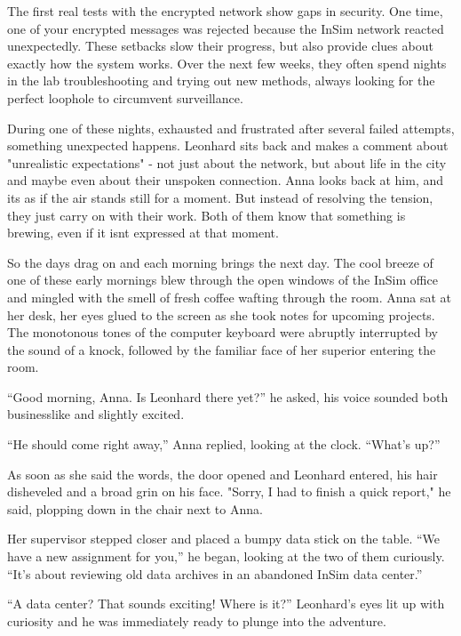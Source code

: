 \documentclass[
]{article}
\begin{document}
The first real tests with the encrypted network show gaps in security.
One time, one of your encrypted messages was rejected because the InSim
network reacted unexpectedly. These setbacks slow their progress, but
also provide clues about exactly how the system works. Over the next few
weeks, they often spend nights in the lab troubleshooting and trying out
new methods, always looking for the perfect loophole to circumvent
surveillance.

During one of these nights, exhausted and frustrated after several
failed attempts, something unexpected happens. Leonhard sits back and
makes a comment about "unrealistic expectations" - not just about the
network, but about life in the city and maybe even about their unspoken
connection. Anna looks back at him, and it\textquotesingle s as if the
air stands still for a moment. But instead of resolving the tension,
they just carry on with their work. Both of them know that something is
brewing, even if it isn\textquotesingle t expressed at that moment.

So the days drag on and each morning brings the next day. The cool
breeze of one of these early mornings blew through the open windows of
the InSim office and mingled with the smell of fresh coffee wafting
through the room. Anna sat at her desk, her eyes glued to the screen as
she took notes for upcoming projects. The monotonous tones of the
computer keyboard were abruptly interrupted by the sound of a knock,
followed by the familiar face of her superior entering the room.

``Good morning, Anna. Is Leonhard there yet?'' he asked, his voice
sounded both businesslike and slightly excited.

``He should come right away,'' Anna replied, looking at the clock.
``What's up?''

As soon as she said the words, the door opened and Leonhard entered, his
hair disheveled and a broad grin on his face. "Sorry, I had to finish a
quick report," he said, plopping down in the chair next to Anna.

Her supervisor stepped closer and placed a bumpy data stick on the
table. ``We have a new assignment for you,'' he began, looking at the
two of them curiously. ``It's about reviewing old data archives in an
abandoned InSim data center.''

``A data center? That sounds exciting! Where is it?'' Leonhard's eyes
lit up with curiosity and he was immediately ready to plunge into the
adventure.
\end{document}
